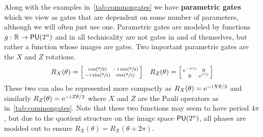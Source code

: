 Along with the examples in~\cref{tab:commongates} we have \textbf{parametric gates} which we view as gates that are dependent on some number of parameters, although we will often just use one.
Parametric gates are modeled by functions $g: \mathbb{R} \to \mathsf{PU} (2^n)$ and in all technicality are not gates in and of themselves, but rather a function whose images are gates.
Two important parametric gates are the $X$ and $Z$ rotations.
\begin{align} %
    R_X(\theta) = \smqty[\cos(\sfrac{\theta}{2}) & -\iu \sin(\sfrac{\theta}{2}) \\ -\iu \sin(\sfrac{\theta}{2}) & \cos(\sfrac{\theta}{2})] && R_Z(\theta) = \smqty[\e^{-\iu \sfrac{\theta}{2}} & 0 \\0 & \e^{\iu\sfrac{\theta}{2}}]
\end{align}
These two can also be represented more compactly as $R_X(\theta) = \mathrm{e}^{-\mkern1mu\mathrm{i}\mkern1mu X \theta / 2}$ and similarly $R_Z(\theta) = \mathrm{e}^{-\mkern1mu\mathrm{i}\mkern1mu Z \theta/2}$ where $X$ and $Z$ are the Pauli operators as in~\cref{tab:commongates}.
Note that these two functions may seem to have period $4\pi$, but due to the quotient structure on the image space $\mathsf{PU} (2^n)$, all phases are modded out to ensure $R_X(\theta) = R_X(\theta + 2\pi)$.

